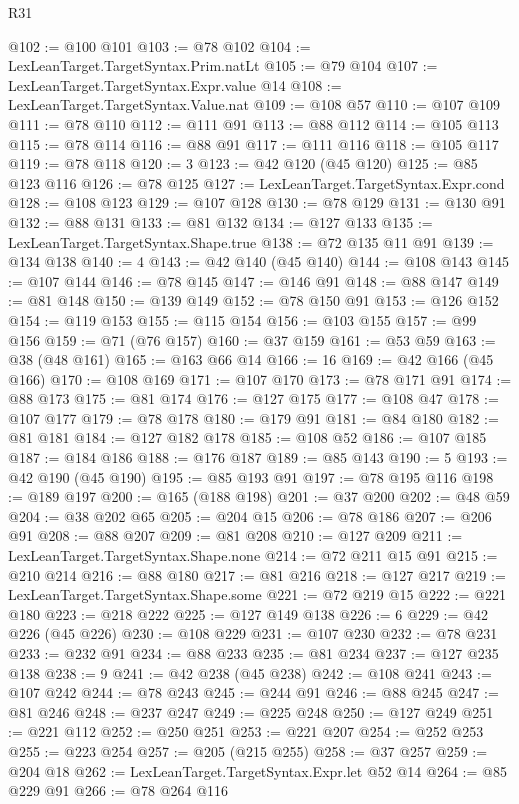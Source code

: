 \begin{lexlean}{R31}
\begin{coremodule}
@102 := @100 @101
@103 := @78 @102
@104 := LexLeanTarget.TargetSyntax.Prim.natLt
@105 := @79 @104
@107 := LexLeanTarget.TargetSyntax.Expr.value @14
@108 := LexLeanTarget.TargetSyntax.Value.nat
@109 := @108 @57
@110 := @107 @109
@111 := @78 @110
@112 := @111 @91
@113 := @88 @112
@114 := @105 @113
@115 := @78 @114
@116 := @88 @91
@117 := @111 @116
@118 := @105 @117
@119 := @78 @118
@120 := 3
@123 := @42 @120 (@45 @120)
@125 := @85 @123 @116
@126 := @78 @125
@127 := LexLeanTarget.TargetSyntax.Expr.cond
@128 := @108 @123
@129 := @107 @128
@130 := @78 @129
@131 := @130 @91
@132 := @88 @131
@133 := @81 @132
@134 := @127 @133
@135 := LexLeanTarget.TargetSyntax.Shape.true
@138 := @72 @135 @11 @91
@139 := @134 @138
@140 := 4
@143 := @42 @140 (@45 @140)
@144 := @108 @143
@145 := @107 @144
@146 := @78 @145
@147 := @146 @91
@148 := @88 @147
@149 := @81 @148
@150 := @139 @149
@152 := @78 @150 @91
@153 := @126 @152
@154 := @119 @153
@155 := @115 @154
@156 := @103 @155
@157 := @99 @156
@159 := @71 (@76 @157)
@160 := @37 @159
@161 := @53 @59
@163 := @38 (@48 @161)
@165 := @163 @66 @14
@166 := 16
@169 := @42 @166 (@45 @166)
@170 := @108 @169
@171 := @107 @170
@173 := @78 @171 @91
@174 := @88 @173
@175 := @81 @174
@176 := @127 @175
@177 := @108 @47
@178 := @107 @177
@179 := @78 @178
@180 := @179 @91
@181 := @84 @180
@182 := @81 @181
@184 := @127 @182 @178
@185 := @108 @52
@186 := @107 @185
@187 := @184 @186
@188 := @176 @187
@189 := @85 @143
@190 := 5
@193 := @42 @190 (@45 @190)
@195 := @85 @193 @91
@197 := @78 @195 @116
@198 := @189 @197
@200 := @165 (@188 @198)
@201 := @37 @200
@202 := @48 @59
@204 := @38 @202 @65
@205 := @204 @15
@206 := @78 @186
@207 := @206 @91
@208 := @88 @207
@209 := @81 @208
@210 := @127 @209
@211 := LexLeanTarget.TargetSyntax.Shape.none
@214 := @72 @211 @15 @91
@215 := @210 @214
@216 := @88 @180
@217 := @81 @216
@218 := @127 @217
@219 := LexLeanTarget.TargetSyntax.Shape.some
@221 := @72 @219 @15
@222 := @221 @180
@223 := @218 @222
@225 := @127 @149 @138
@226 := 6
@229 := @42 @226 (@45 @226)
@230 := @108 @229
@231 := @107 @230
@232 := @78 @231
@233 := @232 @91
@234 := @88 @233
@235 := @81 @234
@237 := @127 @235 @138
@238 := 9
@241 := @42 @238 (@45 @238)
@242 := @108 @241
@243 := @107 @242
@244 := @78 @243
@245 := @244 @91
@246 := @88 @245
@247 := @81 @246
@248 := @237 @247
@249 := @225 @248
@250 := @127 @249
@251 := @221 @112
@252 := @250 @251
@253 := @221 @207
@254 := @252 @253
@255 := @223 @254
@257 := @205 (@215 @255)
@258 := @37 @257
@259 := @204 @18
@262 := LexLeanTarget.TargetSyntax.Expr.let @52 @14
@264 := @85 @229 @91
@266 := @78 @264 @116

\end{coremodule}
\end{lexlean}
